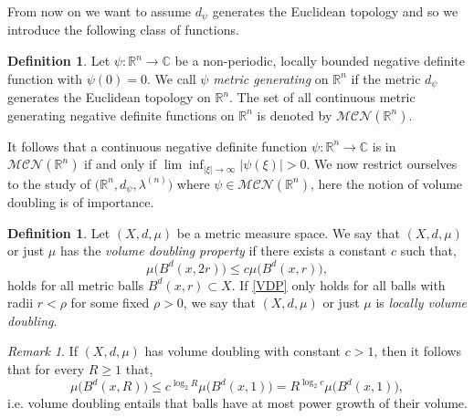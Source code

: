 \documentclass[a4paper, 12pt]{report}
\theoremstyle{cor}
\theoremstyle{remark}
\newtheorem{remark}[theorem]{Remark}
\theoremstyle{definition}
\newtheorem{defn}[theorem]{Definition}
\begin{document}
From now on we want to assume $d_\psi$ generates the Euclidean topology and so we introduce the following class of functions.
\begin{defn}
Let $\psi : \mathbb{R}^n \to \mathbb{C}$ be a non-periodic, locally bounded negative definite function with $\psi(0) = 0$.  We call $\psi$ \emph{metric generating} on $\mathbb{R}^n$ if the metric $d_\psi$ generates the Euclidean topology on $\mathbb{R}^n$.  The set of all continuous metric generating negative definite functions on $\mathbb{R}^n$ is denoted by $\mathcal{MCN}(\mathbb{R}^n)$.
\end{defn}
It follows that a continuous negative definite function $\psi : \mathbb{R}^n \to \mathbb{C}$ is in $\mathcal{MCN}(\mathbb{R}^n)$ if and only if $\lim\inf_{|\xi| \to \infty}|\psi(\xi)| > 0$.  We now restrict ourselves to the study of $\big(\mathbb{R}^n, d_\psi, \lambda^{(n)}\big)$ where $\psi \in \mathcal{MCN}(\mathbb{R}^n)$, here the notion of volume doubling is of importance.
\begin{defn}
Let $(X, d, \mu)$ be a metric measure space.  We say that $(X, d, \mu)$ or just $\mu$ has the \emph{volume doubling property} if there exists a constant $c$ such that,
\begin{equation}\label{VDP}
\mu\big(B^d(x, 2r)\big) \le c\mu\big(B^d(x, r)\big),
\end{equation}
holds for all metric balls $B^d(x, r) \subset X$.  If \eqref{VDP} only holds for all balls with radii $r < \rho$ for some fixed $\rho > 0$, we say that $(X, d, \mu)$ or just $\mu$ is \emph{locally volume doubling}.
\end{defn}
\begin{remark}
If $(X, d, \mu)$ has volume doubling with constant $c > 1$, then it follows that for every $R \ge 1$ that,
$$
\mu\big(B^d(x, R)\big) \le c^{\log_2R}\mu\big(B^d(x, 1)\big) = R^{\log_2c}\mu\big(B^d(x, 1)\big),
$$
i.e. volume doubling entails that balls have at most power growth of their volume.
\end{remark}
\end{document}
